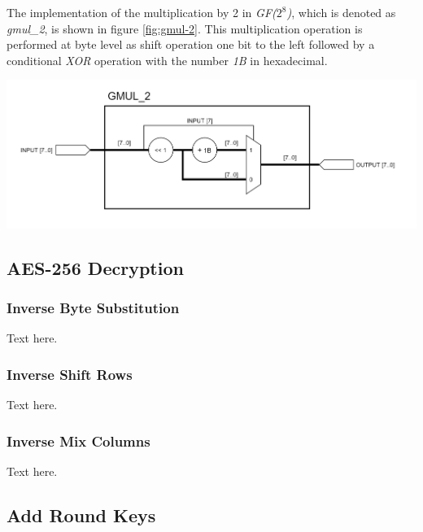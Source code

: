 \documentclass[a4paper, 10pt]{article}
\newenvironment{Figure}
    {\par\medskip\noindent\minipage{\linewidth}}
    {\endminipage\par\medskip}
\begin{document}
\begin{multicols}{2}
            The implementation of the multiplication by 2 in \textit{GF($2^{8}$)}, which is denoted as \textit{gmul\_2}, is shown in figure \ref{fig:gmul-2}. This multiplication operation is performed at byte level as shift operation one bit to the left followed by a conditional \textit{XOR} operation with the number \textit{1B} in hexadecimal.

            \noindent
            \begin{Figure}
                \centering
                \includegraphics[width=\linewidth]{gmul_2.png}
                \label{fig:gmul-2}
            \end{Figure}

            \subsection{AES-256 Decryption}

            \subsubsection{Inverse Byte Substitution}
        
            Text here.

            \subsubsection{Inverse Shift Rows}

            Text here.

            \subsubsection{Inverse Mix Columns}

            Text here.

            \subsection{Add Round Keys}


\end{multicols}
\end{document}

